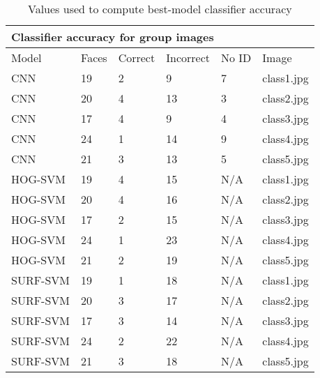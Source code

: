 \begin{table}[ht]
\centering
\begin{tabular}{|l|l|l|l|l|l|}
\hline
\multicolumn{6}{|l|}{Classifier accuracy for group images} \\ \hline
Model &  Faces & Correct & Incorrect & No ID & Image \\ \hline
CNN & 19 & 2 & 9 & 7 & class1.jpg \\ \hline
CNN & 20 & 4 & 13 & 3 & class2.jpg  \\ \hline
CNN & 17 & 4 & 9 & 4 & class3.jpg  \\ \hline
CNN & 24 & 1 & 14 & 9 & class4.jpg  \\ \hline
CNN & 21 & 3 & 13 & 5 & class5.jpg  \\ \hline
HOG-SVM & 19 & 4 & 15 & N/A & class1.jpg \\ \hline
HOG-SVM & 20 & 4 & 16 & N/A & class2.jpg  \\ \hline
HOG-SVM & 17 & 2 & 15 & N/A & class3.jpg  \\ \hline
HOG-SVM & 24 & 1 & 23 & N/A & class4.jpg  \\ \hline
HOG-SVM & 21 & 2 & 19 & N/A & class5.jpg  \\ \hline
SURF-SVM & 19 & 1 & 18 & N/A & class1.jpg \\ \hline
SURF-SVM & 20 & 3 & 17 & N/A & class2.jpg  \\ \hline
SURF-SVM & 17 & 3 & 14 & N/A & class3.jpg  \\ \hline
SURF-SVM & 24 & 2 & 22 & N/A & class4.jpg  \\ \hline
SURF-SVM & 21 & 3 & 18 & N/A & class5.jpg  \\ \hline
\end{tabular}
\caption{Values used to compute best-model classifier accuracy}
\label{table:group_image_stats}
\end{table}